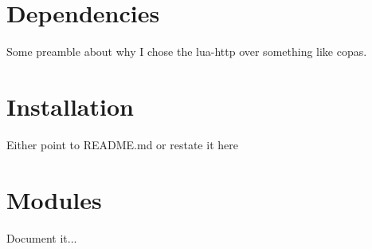 \documentclass[12pt, oneside]{memoir}
\newcommand*{\novus}[0]{\nbright{\texttt{novus}}\xspace}
\newcommand*{\nbg}[0]{
    \pagecolor{novus-bg}
    \color{white}
}
\newcommand*{\naccent}[1]{
    {\color{novus-accent} #1}
}
\newcommand*{\nbright}[1]{
    {\color{novus-bright} #1}
}
\newlength{\drop}
\newcommand*{\novustitle}[0]{
\begingroup
    \drop = 0.1\textheight
    \hbox{%
        \hspace*{0.01\textwidth}%
        \naccent{\rule{2pt}{\textheight}}
        \hspace*{0.05\textwidth}%
        \parbox[b]{0.75\textwidth}{
        \vbox{%
            \vspace{\drop}
            {\noindent\Huge\bfseries The\\[0.5\baselineskip]
                \novus User Manual}\\[2\baselineskip]
            {\Large\itshape For creating lightweight discord  bots in lua.}\\[4\baselineskip]
            {\Large Magicks}\par
            \vspace{0.4\textheight}
            {\noindent\url{https://github.com/Mehgugs/novus.git}}\\[\baselineskip]
        }
        }
    }
    \vfill
    \null
\endgroup}
\begin{document}
    \nbg
    \begin{titlingpage}
        \thispagestyle{empty}
        \novustitle
    \end{titlingpage}
    \tableofcontents

    \chapter{Dependencies}
    Some preamble about why I chose the lua-http over something like copas.
    \pagebreak
    \chapter{Installation}
    Either point to README.md or restate it here
    \pagebreak
    \chapter{Modules}
    Document it...
\end{document}
